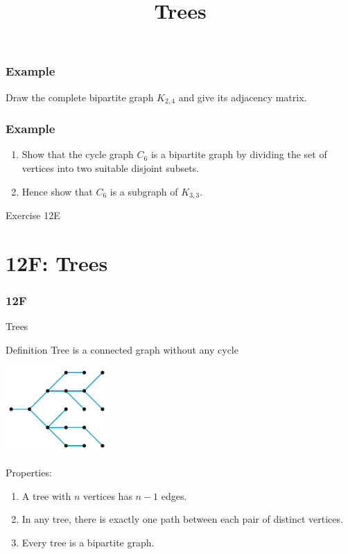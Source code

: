 \documentclass[
	11pt, %
]{beamer}
\begin{document}
\begin{frame}[t]
    \frametitle{Example}
    Draw the complete bipartite graph $K_{2,4}$ and give its adjacency matrix.
    
\end{frame}

\begin{frame}[t]
    \frametitle{Example}
    \begin{enumerate}
        \item Show that the cycle graph $C_6$ is a bipartite graph by dividing the set of vertices into two
        suitable disjoint subsets.
        \item Hence show that $C_6$ is a subgraph of $K_{3,3}$.
    \end{enumerate}
    
\end{frame}
\begin{frame}
\end{frame}

\begin{frame}{Exercise 12E}
\end{frame}

\section{12F: Trees}
\begin{frame}
    \frametitle{12F}
    \begin{center}
        \title{Trees}
        \maketitle
    \end{center}
\end{frame}

\begin{frame}{Trees}
    \begin{block}{Definition}
        Tree is a connected graph without any cycle
        \begin{center}
            \includegraphics[width = 4cm]{Tree.png}\\
        \end{center}
    \end{block}
    Properties:
    \begin{enumerate}
        \item A tree with $n$ vertices has $n - 1$ edges.
        \item In any tree, there is exactly one path between each pair of distinct vertices.
        \item Every tree is a bipartite graph.
    \end{enumerate}
\end{frame}
\end{document}
